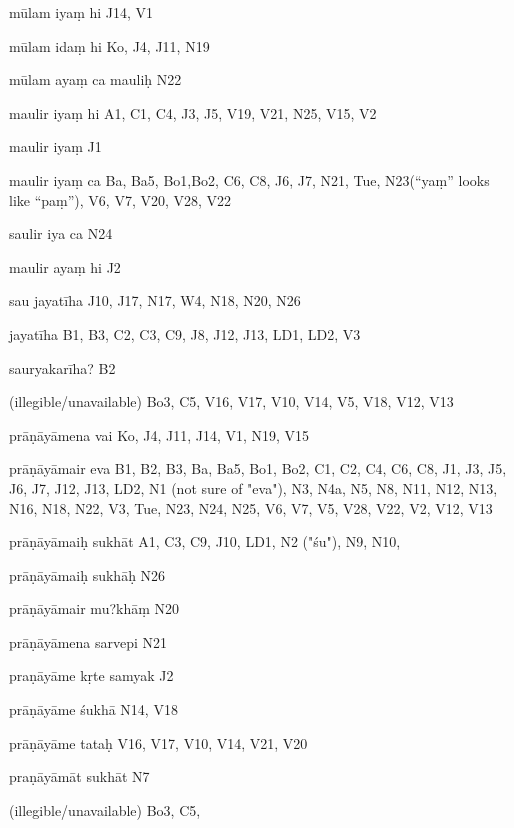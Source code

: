 \begin{ekdosis}
\begin{marma}[hp01_055]
\begin{marma}[hp02_009]
\begin{marma}[hp02_011]
      \begin{marma}[hp02_35d]
      \item[mūlam iyaṃ hi] J14, V1
      \item[mūlam idaṃ hi] Ko, J4, J11, N19
      \item[mūlam ayaṃ ca mauliḥ] N22
      \item[maulir iyaṃ hi] A1, C1, C4, J3, J5, V19, V21, N25, V15, V2
      \item[maulir iyaṃ] J1
      \item[maulir iyaṃ ca] Ba, Ba5, Bo1,Bo2, C6, C8, J6, J7, N21, Tue, N23(“yaṃ” looks like “paṃ”), V6, V7, V20, V28, V22
      \item[saulir iya ca] N24
      \item[maulir ayaṃ hi] J2
      \item[sau jayatīha] J10, J17, N17, W4, N18, N20, N26
      \item[jayatīha] B1, B3, C2, C3, C9, J8, J12, J13, LD1, LD2, V3
      \item[sauryakarīha?] B2
      \item[(illegible/unavailable)] Bo3, C5, V16, V17, V10, V14, V5, V18, V12, V13
        \begin{description}

        \end{description}
      \end{marma}

      \begin{marma}[hp02_38a]
      \item[prāṇāyāmena vai] Ko, J4, J11, J14, V1, N19, V15
      \item[prāṇāyāmair eva] B1, B2, B3, Ba, Ba5, Bo1, Bo2, C1, C2, C4, C6, C8, J1, J3, J5, J6, J7, J12, J13, LD2, N1 (not sure of "eva"), N3, N4a, N5, N8, N11, N12, N13, N16, N18, N22, V3, Tue, N23, N24, N25, V6, V7, V5, V28, V22, V2, V12, V13
      \item[prāṇāyāmaiḥ sukhāt] A1, C3, C9, J10, LD1, N2 ("śu"), N9, N10,
      \item[prāṇāyāmaiḥ sukhāḥ] N26
      \item[prāṇāyāmair mu?khāṃ] N20
      \item[prāṇāyāmena sarvepi] N21
      \item[praṇāyāme kṛte samyak] J2
      \item[prāṇāyāme śukhā] N14, V18
      \item[prāṇāyāme tataḥ] V16, V17, V10, V14, V21, V20
      \item[praṇāyāmāt sukhāt] N7
      \item[(illegible/unavailable)] Bo3, C5,
        \begin{description}


\end{description}
\end{marma}
\end{marma}
\end{marma}
\end{marma}
\end{ekdosis}
